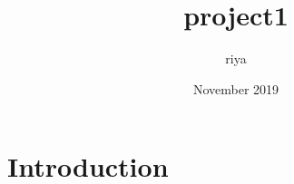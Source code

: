\documentclass{article}
\title{project1}
\author{riya }
\date{November 2019}
\begin{document}
\maketitle

\section{Introduction}
\end{document}

